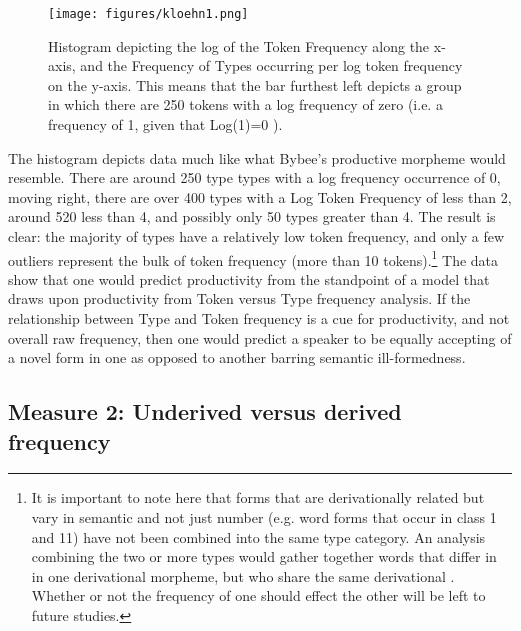 \documentclass[output=paper,modfonts]{langscibook}
\begin{document}
\begin{figure}
\texttt{[image: figures/kloehn1.png]}
\caption{Histogram depicting the log of the Token Frequency along the x-axis, and the Frequency of Types occurring per log token frequency on the y-axis. This means that the bar furthest left depicts a group in which there are 250 tokens with a log frequency of zero (i.e. a frequency of 1, given that Log(1)=0 ).}
\label{fig:kloehn:1}
\end{figure} 

\newpage 
The histogram depicts data much like what Bybee’s productive morpheme would resemble. There are around 250 type types with a log frequency occurrence of 0, moving right, there are over 400 types with a Log Token Frequency of less than 2, around 520 less than 4, and possibly only 50 types greater than 4. The result is clear: the majority of types have a relatively low token frequency, and only a few outliers represent the bulk of token frequency (more than 10 tokens).{}\footnote{It is important to note here that forms that are derivationally related but vary in semantic  and not just number (e.g. word forms that occur in class 1 and 11) have not been combined into the same type category. An analysis combining the two or more types would gather together words that differ in in one derivational morpheme, but who share the same derivational . Whether or not the frequency of one should effect the other will be left to future studies.} The data show that one would predict productivity from the standpoint of a model that draws upon productivity from Token versus Type frequency analysis. If the relationship between Type and Token frequency is a cue for productivity, and not overall raw frequency, then one would predict a speaker to be equally accepting of a novel form in one  as opposed to another barring semantic ill-formedness.
 
\subsection{Measure 2: Underived versus derived frequency}\label{sec:kloehn:2.2}
\end{document}
